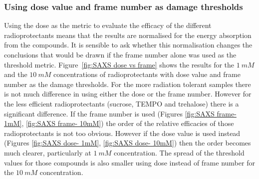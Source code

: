 \subsubsection{Using dose value and frame number as damage thresholds}
\label{subs:Using dose value and frame number as damage thresholds}
Using the dose as the metric to evaluate the efficacy of the different radioprotectants means that the results are normalised for the energy absorption from the compounds. It is sensible to ask whether this normalisation changes the conclusions that would be drawn if the frame number alone was used as the threshold metric.
Figure~\ref{fig:SAXS dose vs frame} shows the results for the $1\ mM$ and the $10\ mM$ concentrations of radioprotectants with dose value and frame number as the damage thresholds.
For the more radiation tolerant samples there is not much difference in using either the dose or the frame number.
However for the less efficient radioprotectants (sucrose, TEMPO and trehalose) there is a significant difference.
If the frame number is used (Figures \ref{fig:SAXS frame- 1mM}, \ref{fig:SAXS frame- 10mM}) the order of the relative efficacies of those radioprotectants is not too obvious.
However if the dose value is used instead (Figures \ref{fig:SAXS dose- 1mM}, \ref{fig:SAXS dose- 10mM}) then the order becomes much clearer, particularly at $1\ mM$ concentration.
The spread of the threshold values for those compounds is also smaller using dose instead of frame number for the $10\ mM$ concentration.
